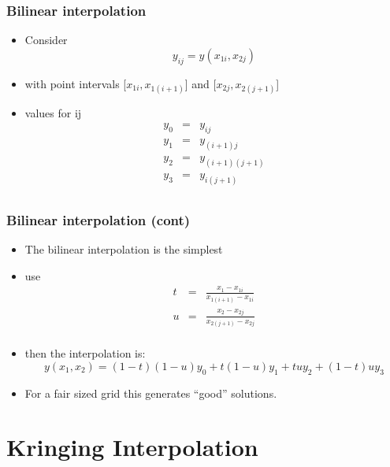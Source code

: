 \documentclass[10pt]{beamer}
\begin{document}
\begin{frame}
  \frametitle{Bilinear interpolation}
  \begin{itemize}
  \item Consider
    \[ y_{ij} = y(x _{1i}, x_{2j}) \]
  \item with point intervals [$x_{1i}, x_{1(i+1)}$] and  [$x_{2j}, x_{2(j+1)}$] 
  \item values for ij
    \[
      \begin{array}{ccc}
        y_0& = & y_{ij}\\
        y_1& = & y_{(i+1)j}\\
        y_2& = & y_{(i+1)(j+1)}\\
        y_3& = & y_{i(j+1)}\\
      \end{array}
    \]
  \end{itemize}
\end{frame}

\begin{frame}
  \frametitle{Bilinear interpolation (cont)}
  \begin{itemize}
  \item The bilinear interpolation is the simplest
  \item use
    \[
      \begin{array}{ccc}
        t & = & \frac{x_1 - x_{1i}}{x_{1(i+1)} - x_{1i}}\\
        u & = & \frac{x_2 - x_{2j}}{x_{2(j+1)} - x_{2j}}\\
      \end{array}
    \]
  \item then the interpolation is:
    \[
      y(x_1, x_2) = (1-t)(1-u) y_0 + t(1-u) y_1 + tu y_2 + (1-t)u y_3
    \]
  \item For a fair sized grid this generates ``good'' solutions. 
  \end{itemize}
\end{frame}

\section{Kringing Interpolation}
\end{document}
